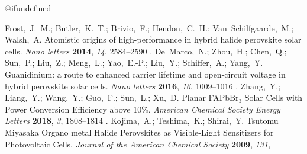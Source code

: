 \documentclass[journal=jpclcd,manuscript=letter]{achemso}
\begin{document}
\csname @ifundefined
  {\let\endmcitethebibliography\endthebibliography}{}
\begin{mcitethebibliography}{49}
\providecommand*\natexlab[1]{#1}
\providecommand*\mciteSetBstSublistMode[1]{}
\providecommand*\mciteSetBstMaxWidthForm[2]{}
\providecommand*\mciteBstWouldAddEndPuncttrue
  {\def\EndOfBibitem{\unskip.}}
\providecommand*\mciteBstWouldAddEndPunctfalse
  {\let\EndOfBibitem\relax}
\providecommand*\mciteSetBstMidEndSepPunct[3]{}
\providecommand*\mciteSetBstSublistLabelBeginEnd[3]{}
\providecommand*\EndOfBibitem{}
\mciteSetBstSublistMode{f}
\mciteSetBstMaxWidthForm{subitem}{(\alph{mcitesubitemcount})}
\mciteSetBstSublistLabelBeginEnd
  {\mcitemaxwidthsubitemform\space}
  {\relax}
  {\relax}

Frost,~J.~M.; Butler,~K.~T.; Brivio,~F.; Hendon,~C.~H.; Van~Schilfgaarde,~M.;
  Walsh,~A. Atomistic origins of high-performance in hybrid halide perovskite
  solar cells. \emph{Nano letters} \textbf{2014}, \emph{14}, 2584--2590\relax
\mciteBstWouldAddEndPuncttrue
\mciteSetBstMidEndSepPunct{\mcitedefaultmidpunct}
{\mcitedefaultendpunct}{\mcitedefaultseppunct}\relax
\EndOfBibitem
{}
De~Marco,~N.; Zhou,~H.; Chen,~Q.; Sun,~P.; Liu,~Z.; Meng,~L.; Yao,~E.-P.;
  Liu,~Y.; Schiffer,~A.; Yang,~Y. Guanidinium: a route to enhanced carrier
  lifetime and open-circuit voltage in hybrid perovskite solar cells.
  \emph{Nano letters} \textbf{2016}, \emph{16}, 1009--1016\relax
\mciteBstWouldAddEndPuncttrue
\mciteSetBstMidEndSepPunct{\mcitedefaultmidpunct}
{\mcitedefaultendpunct}{\mcitedefaultseppunct}\relax
\EndOfBibitem
{}
Zhang,~Y.; Liang,~Y.; Wang,~Y.; Guo,~F.; Sun,~L.; Xu,~D. Planar
  FAPb${\mathrm{Br}_{3}}$ Solar Cells with Power Conversion Efficiency above
  10\%. \emph{American Chemical Society Energy Letters} \textbf{2018},
  \emph{3}, 1808--1814\relax
\mciteBstWouldAddEndPuncttrue
\mciteSetBstMidEndSepPunct{\mcitedefaultmidpunct}
{\mcitedefaultendpunct}{\mcitedefaultseppunct}\relax
\EndOfBibitem
{}
Kojima,~A.; Teshima,~K.; Shirai,~Y. Tsutomu Miyasaka Organo metal Halide
  Perovskites as Visible-Light Sensitizers for Photovoltaic Cells.
  \emph{Journal of the American Chemical Society} \textbf{2009}, \emph{131},

\end{mcitethebibliography}
\end{document}
